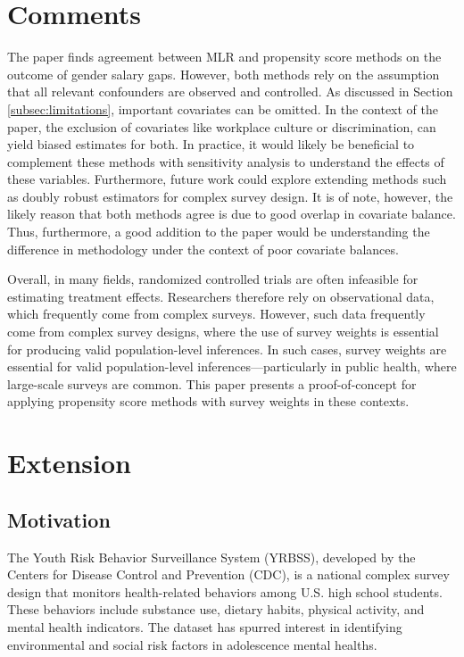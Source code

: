 \documentclass[12pt]{article}
\begin{document}
\section{Comments} \label{sec:finalcomments}

The paper finds agreement between MLR and propensity score methods on the outcome of gender salary gaps. However, both methods rely on the assumption that all relevant confounders are observed and controlled. As discussed in Section \ref{subsec:limitations}, important covariates can be omitted. In the context of the paper, the exclusion of covariates like workplace culture or discrimination, can yield biased estimates for both. In practice, it would likely be beneficial to complement these methods with sensitivity analysis to understand the effects of these variables. Furthermore, future work could explore extending methods such as doubly robust estimators for complex survey design. It is of note, however, the likely reason that both methods agree is due to good overlap in covariate balance. Thus, furthermore, a good addition to the paper would be understanding the difference in methodology under the context of poor covariate balances. 

Overall, in many fields, randomized controlled trials are often infeasible for estimating treatment effects. Researchers therefore rely on observational data, which frequently come from complex surveys. However, such data frequently come from complex survey designs, where the use of survey weights is essential for producing valid population-level inferences. In such cases, survey weights are essential for valid population-level inferences—particularly in public health, where large-scale surveys are common. This paper presents a proof-of-concept for applying propensity score methods with survey weights in these contexts.

\section{Extension} \label{sec:Extension}

\subsection{Motivation} \label{subsec:ExtMotivation}

The Youth Risk Behavior Surveillance System (YRBSS), developed by the Centers for Disease Control and Prevention (CDC), is a national complex survey design that monitors health-related behaviors among U.S. high school students. These behaviors include substance use, dietary habits, physical activity, and mental health indicators. The dataset has spurred interest in identifying environmental and social risk factors in adolescence mental healths. 
\end{document}
